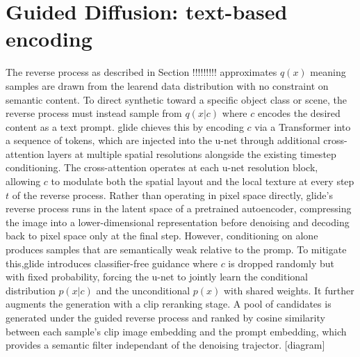\section{Guided Diffusion: text-based encoding}
The reverse process as described in Section !!!!!!!!! approximates $q(x)$ meaning samples are drawn from the learend data distribution with no constraint on semantic content. To direct synthetic toward a specific object class or scene, 
the reverse process must instead sample from $q(x|c)$ where $c$ encodes the desired content as a text prompt. \gls{glide}\cite{glide} chieves this by encoding $c$ via a Transformer into a sequence of tokens, which are injected into the \gls{u-net} 
through additional cross-attention layers at multiple spatial resolutions alongside the existing timestep conditioning. The cross-attention operates at each \gls{u-net} resolution block, allowing $c$ to modulate both the spatial layout and the local texture 
at every step $t$ of the reverse process. Rather than operating in pixel space directly, \gls{glide}'s reverse process runs in the latent 
space of a pretrained autoencoder, compressing the image into a lower-dimensional representation before denoising and decoding back to pixel 
space only at the final step. However, conditioning on  alone produces samples that are semantically weak relative to the promp\cite{glide}. 
To mitigate this,\gls{glide} introduces classifier-free guidance where $c$ is dropped randomly but with fixed probability, 
forcing the \gls{u-net} to jointly learn the conditional distribution $p(x|c)$ and the unconditional $p(x)$ with shared weights. 
It further augments the generation with a \gls{clip}\cite{clip} reranking stage. A pool of candidates is generated under the guided 
reverse process and ranked by \gls{cosine similarity} between each sample's \gls{clip} image  embedding and the prompt embedding, which provides 
a semantic filter independant of the denoising trajector\cite{glide}.
[diagram]

